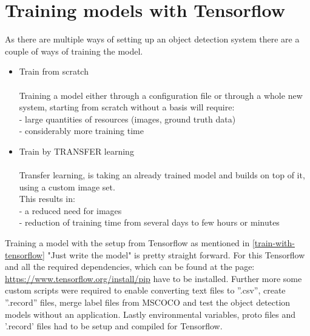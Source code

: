 \section{Training models with Tensorflow}\label{models-with-tensorflow}
As there are multiple ways of setting up an object detection system there are a couple of ways of training the model.
\begin{itemize}
    \item Train from scratch \\ \\
        Training a model either through a configuration file or through a whole new system, starting from scratch
        without a basis will require: \\
        {- large quantities of resources (images, ground truth data)} \\
        {- considerably more training time} \\
    \item Train by TRANSFER learning \\ \\
        Transfer learning, is taking an already trained model and builds on top of it, using a custom image set.\\
        This results in: \\
        {- a reduced need for images} \\
        {- reduction of training time from several days to few hours or minutes} \\
\end{itemize}
Training a model with the setup from Tensorflow as mentioned in \ref{train-with-tensorflow} "Just write the model" is pretty straight forward.
For this Tensorflow and all the required dependencies, which can be found at the page: \url{https://www.tensorflow.org/install/pip} have to
be installed.
Further more some custom scripts were required to enable converting text files to ''.csv'', create ''.record'' files, merge label files from
MSCOCO and test the object detection models without an application. Lastly environmental variables, proto files and '.record' files had to
be setup and compiled for Tensorflow.
\newpage \noindent
